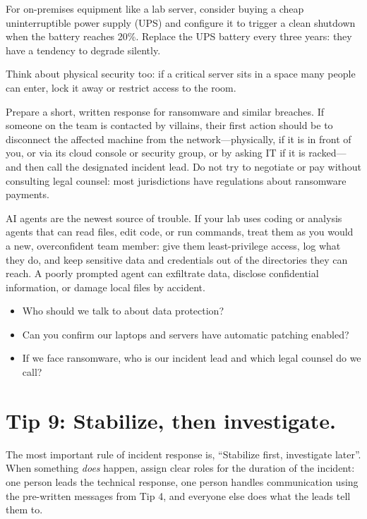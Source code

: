 \documentclass[10pt,letterpaper]{article}
\begin{document}
For on-premises equipment like a lab server, consider buying a cheap
uninterruptible power supply (UPS) and configure it to trigger a clean shutdown
when the battery reaches 20\%.  Replace the UPS battery every three years: they
have a tendency to degrade silently.

Think about physical security too: if a critical server sits in a space many
people can enter, lock it away or restrict access to the room.

Prepare a short, written response for ransomware and similar breaches. If
someone on the team is contacted by villains, their first action should be to
disconnect the affected machine from the network---physically, if it is in front
of you, or via its cloud console or security group, or by asking IT if it is
racked---and then call the designated incident lead. Do not try to negotiate or
pay without consulting legal counsel: most jurisdictions have regulations about
ransomware payments.

AI agents are the newest source of trouble. If your lab uses coding or analysis
agents that can read files, edit code, or run commands, treat them as you would
a new, overconfident team member: give them least-privilege access, log what
they do, and keep sensitive data and credentials out of the directories they can
reach. A poorly prompted agent can exfiltrate data, disclose confidential
information, or damage local files by accident.

\begin{notebox}
  \begin{itemize}
  \item Who should we talk to about data protection?
  \item Can you confirm our laptops and servers have automatic patching enabled?
  \item If we face ransomware, who is our incident lead and which legal counsel
    do we call?
  \end{itemize}
\end{notebox}

\section*{Tip 9: Stabilize, then investigate.}

The most important rule of incident response is, ``Stabilize first, investigate
later''.  When something \emph{does} happen, assign clear roles for the duration
of the incident: one person leads the technical response, one person handles
communication using the pre-written messages from Tip 4, and everyone else does
what the leads tell them to.
\end{document}
